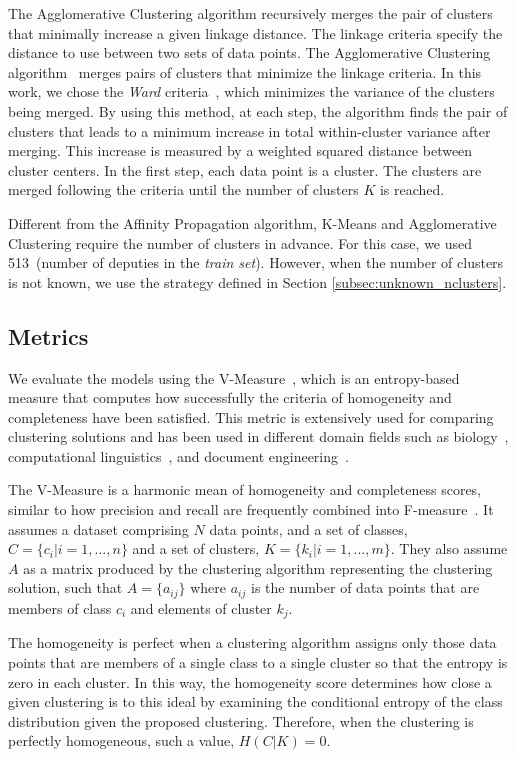 The Agglomerative Clustering algorithm recursively merges the pair of clusters that minimally increase a given linkage distance.
The linkage criteria specify the distance to use between two sets of data points.
The Agglomerative Clustering algorithm~\cite{ward1963hierarchical} merges pairs of clusters that minimize the linkage criteria.
In this work, we chose the \emph{Ward} criteria~\cite{ward1963hierarchical}, which minimizes the variance of the clusters being merged.
By using this method, at each step, the algorithm finds the pair of clusters that leads to a minimum increase in total within-cluster variance after merging.
This increase is measured by a weighted squared distance between cluster centers.
In the first step, each data point is a cluster.
The clusters are merged following the criteria until the number of clusters $K$ is reached.

Different from the Affinity Propagation algorithm, K-Means and Agglomerative Clustering require the number of clusters in advance. For this case, we used 513~(number of deputies in the \emph{train set}).
However, when the number of clusters is not known, we use the strategy defined in Section \ref{subsec:unknown_nclusters}.

\subsection{Metrics}

We evaluate the models using the V-Measure~\cite{vmeasure}, which is an entropy-based measure that computes how successfully the criteria of homogeneity and completeness have been satisfied. This metric is extensively used for comparing clustering solutions and has been used in different domain fields such as biology~\cite{bio1}, computational linguistics~\cite{nlp1}, and document engineering~\cite{doceng}.


The V-Measure is a harmonic mean of homogeneity and completeness scores, similar to how precision and recall are frequently combined into F-measure~\cite{van1979information}. It assumes a dataset comprising $N$ data points, and a set of classes, $C = \{c_i|i = 1,..., n\}$ and a set of clusters, $K = \{k_i|i = 1,...,m\}$. They also assume $A$ as a matrix produced by the clustering algorithm representing the clustering solution, such that $A = \{a_{ij}\}$ where $a_{ij}$ is the number of data points that are members of class $c_i$ and elements of cluster $k_j$.

The homogeneity is perfect when a clustering algorithm assigns only those data points that are members of a single class to a single cluster so that the entropy is zero in each cluster.
In this way, the homogeneity score determines how close a given clustering is to this ideal by examining the conditional entropy of the class distribution given the proposed clustering. 
Therefore, when the clustering is perfectly homogeneous, such a value, $H(C|K) = 0$. 
 
